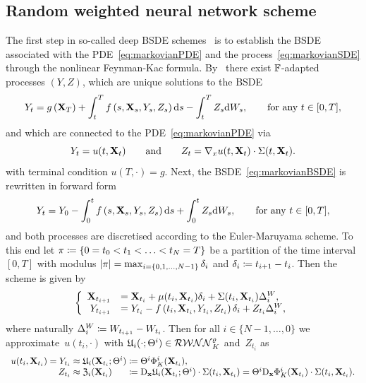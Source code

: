 \subsection{Random weighted neural network scheme}
The first step in so-called deep BSDE schemes~\cite{E2017DeepEquations, Han2018SolvingLearning, Hure2020DeepPDEs} is to establish the BSDE associated with the PDE~\eqref{eq:markovianPDE} and the process~\eqref{eq:markovianSDE} through the nonlinear Feynman-Kac formula. By~\cite{Pardoux1990AdaptedEquation} there exist $\mathbb{F}$-adapted processes $(Y, Z)$, which are unique solutions to the BSDE
\begin{equation}\label{eq:markovianBSDE}
Y_{t}=g\left(\mathbf{X}_{T}\right)+\int_{t}^{T} f\left(s, \mathbf{X}_{s}, Y_{s}, Z_{s}\right) \mathrm{d} s-\int_{t}^{T} Z_{s} \mathrm{d} W_{s},
\qquad\text{for any }t \in [0,T],
\end{equation}
and which are connected to the PDE~\eqref{eq:markovianPDE} via
$$
Y_t = u(t, \mathbf{X}_t) \qquad \text{and} \qquad Z_t = \nabla_x u(t,\mathbf{X}_t)\cdot\Sigma(t,\mathbf{X}_t).  
$$
with terminal condition $u(T, \cdot)=g$. Next, the BSDE~\eqref{eq:markovianBSDE} is rewritten in forward form
\begin{equation*}
    Y_{t}=Y_0 - \int_{0}^{t} f\left(s, \mathbf{X}_{s}, Y_{s}, Z_{s}\right) \mathrm{d} s + \int_{0}^{t} Z_{s} \mathrm{d} W_{s},
\qquad\text{for any }t \in [0,T],
\end{equation*}
and both processes are discretised according to the Euler-Maruyama scheme. To this end let $\pi\coloneqq \left\{0=t_{0}<t_{1}<\ldots<t_{N}=T\right\}$ be a partition of the time interval $[0,T]$ with modulus $|\pi|=\max_{i=\{0,1, \dots, N-1\}} \delta_{i} $ and $\delta_{i} \coloneqq  t_{i+1}-t_{i}$. Then the scheme is given by
\begin{equation}\label{eq:EulerMaruyama}
\left\{
\begin{array}{rl}
    \mathbf{X}_{t_{i+1}} &= \mathbf{X}_{t_{i}} + \mu(t_{i}, \mathbf{X}_{t_{i}})\delta_{i}  + \Sigma(t_{i}, \mathbf{X}_{t_{i}})\Delta^{W}_{i}, \\
    Y_{t_{i+1}} &= Y_{t_{i}} - f\left(t_{i}, \mathbf{X}_{t_{i}}, Y_{t_{i}}, Z_{t_i}\right)\delta_{i} + Z_{t_i}\Delta^{W}_{i},
\end{array}
\right.
\end{equation}
where naturally $\Delta^{W}_{i}\coloneqq  W_{t_{i+1}} - W_{t_i}$.
Then for all $i\in\{N-1,\dots,0\}$ we approximate~$u(t_i,\cdot)$ with $\mathfrak{U}_i(\cdot;\Theta^i)\in\mathcal{RWNN}_{K}^\varrho$ 
and~$Z_{t_i}$ as
\begin{equation*}
\begin{array}{rll}
u(t_i,\XX_{t_i}) = Y_{t_i}
&\hspace*{-0.25cm}\approx \Uf_i(\XX_{t_i};\Theta^i)
&\hspace*{-0.25cm}\defEqual\Theta^i \Phi_K^i(\XX_{t_i}),\\
Z_{t_i} &\hspace*{-0.25cm}\approx \Zf_{i}(\XX_{t_i}) 
&\hspace*{-0.25cm}\defEqual \Dxx \Uf_i(\XX_{t_i};\Theta^i)\cdot\Sigma(t_i,\XX_{t_i})
 = \Theta^i \Dxx \Phi_K^i(\XX_{t_i})\cdot\Sigma(t_i,\XX_{t_i}).
 \end{array}
\end{equation*}
